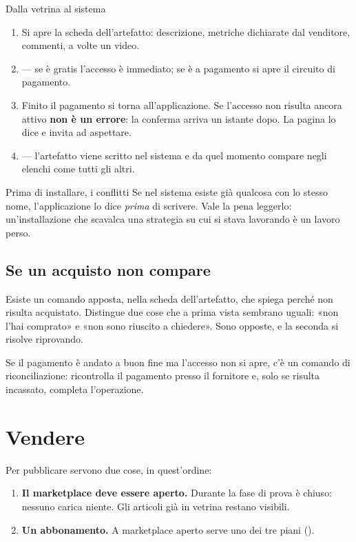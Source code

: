 \begin{pratica}{Dalla vetrina al sistema}
\begin{enumerate}
  \item Si apre la scheda dell'artefatto: descrizione, metriche dichiarate
        dal venditore, commenti, a volte un video.
  \item {} --- se è gratis l'accesso è immediato; se è a
        pagamento si apre il circuito di pagamento.
  \item Finito il pagamento si torna all'applicazione. Se l'accesso non
        risulta ancora attivo \textbf{non è un errore}: la conferma arriva
        un istante dopo. La pagina lo dice e invita ad aspettare.
  \item {} --- l'artefatto viene scritto nel sistema e da
        quel momento compare negli elenchi come tutti gli altri.
\end{enumerate}
\end{pratica}

\begin{nota}{Prima di installare, i conflitti}
Se nel sistema esiste già qualcosa con lo stesso nome, l'applicazione lo
dice \emph{prima} di scrivere. Vale la pena leggerlo: un'installazione che
scavalca una strategia su cui si stava lavorando è un lavoro perso.
\end{nota}

\subsection{Se un acquisto non compare}

Esiste un comando apposta, nella scheda dell'artefatto, che spiega perché
non risulta acquistato. Distingue due cose che a prima vista sembrano
uguali: «non l'hai comprato» e «non sono riuscito a chiedere». Sono
opposte, e la seconda si risolve riprovando.

Se il pagamento è andato a buon fine ma l'accesso non si apre, c'è un
comando di riconciliazione: ricontrolla il pagamento presso il fornitore e,
solo se risulta incassato, completa l'operazione.

\section{Vendere}\label{sez:vendere}

Per pubblicare servono due cose, in quest'ordine:

\begin{enumerate}
  \item \textbf{Il marketplace deve essere aperto.} Durante la fase di
        prova è chiuso: nessuno carica niente. Gli articoli già in vetrina
        restano visibili.
  \item \textbf{Un abbonamento.} A marketplace aperto serve uno dei tre
        piani ().
\end{enumerate}

